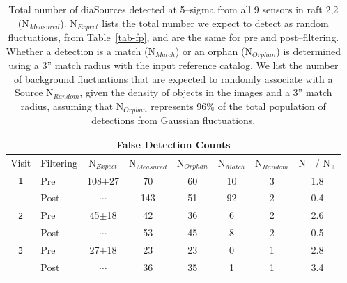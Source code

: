 \documentclass[floatfix, apj]{emulateapj}
\begin{document}
\begin{table}[t]
\centering
\begin{tabular}{clc|ccccc}
\hline
\multicolumn{8}{|c|}{False Detection Counts} \\
\hline
Visit   & Filtering & N$_{Expect}$ & N$_{Measured}$ &  N$_{Orphan}$ & N$_{Match}$ & N$_{Random}$ & N$_{-}$ / N$_{+}$\\
\hline
{\tt 1} & Pre      & 108$\pm$27   & 70      &60         & 10 & 3  & 1.8 \\ 
        & Post     & $\cdots$     & 143     &51         & 92 & 2  & 0.4 \\
{\tt 2} & Pre      & 45$\pm$18    & 42      &36         & 6  & 2  & 2.6 \\
        & Post     & $\cdots$     & 53      &45         & 8  & 2  & 0.5 \\
{\tt 3} & Pre      & 27$\pm$18    & 23      &23         & 0  & 1  & 2.8 \\
        & Post     & $\cdots$     & 36      &35         & 1  & 1  & 3.4 \\
\end{tabular}
\caption{Total number of diaSources detected at 5--sigma from all 9 sensors in raft 2,2 (N$_{Measured}$).
  N$_{Expect}$ lists the total number we expect to detect as random fluctuations, from Table~\ref{tab-fp}, and are the same for pre and post--filtering.
  Whether a detection is a match (N$_{Match}$) or an orphan (N$_{Orphan}$) is determined using a 3'' match radius with the input reference catalog.
  We list the number of background fluctuations that are expected to randomly associate with a Source N$_{Random}$, given the density of objects in the images and a 3'' match radius, assuming that N$_{Orphan}$ represents 96\% of the total population of detections from Gaussian fluctuations.
  \label{tab-bestfp10}}
\end{table}
\end{document}
